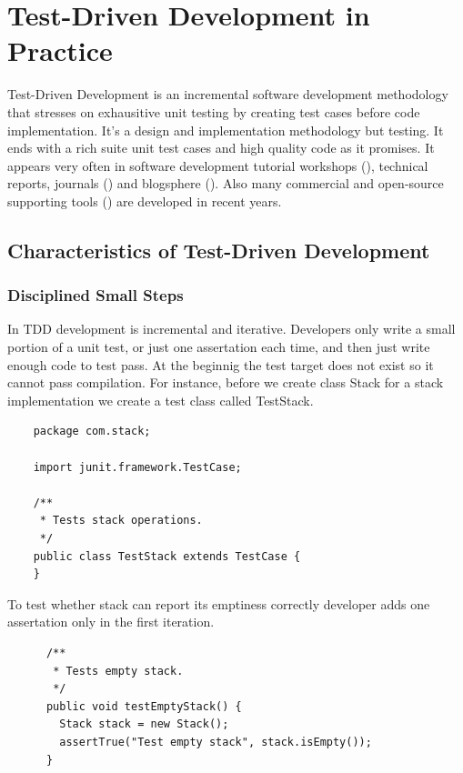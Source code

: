 \section{Test-Driven Development in Practice}
Test-Driven Development is an incremental software development methodology
that stresses on exhausitive unit testing by creating test cases before
code implementation. It's a design and implementation methodology but
testing.  It ends with a rich suite unit test cases and high quality code
as it promises. It appears very often in software development tutorial
workshops
(\cite{OsheroveWorkshop:04,ClarkwareWorkshop:04,BENUGWorkshop:04,AdaptionTddWorkshop,IntustrialLogicTddWorkshop}),
technical reports, journals (\cite{TestDrivenDotComArticles}) and
blogsphere (\cite{TestDrivenDotComWeblogs}). Also many commercial and
open-source supporting tools (\cite{TestDrivenDotComTools}) are developed
in recent years.

\subsection{Characteristics of Test-Driven Development}

\subsubsection{Disciplined Small Steps}
In TDD development is incremental and iterative. Developers only write a
small portion of a unit test, or just one assertation each time, and then
just write enough code to test pass. At the beginnig the test target does
not exist so it cannot pass compilation. For instance, before we create
class Stack for a stack implementation we create a test class called TestStack.

    \begin{verbatim}
    package com.stack;

    import junit.framework.TestCase;

    /**
     * Tests stack operations. 
     */
    public class TestStack extends TestCase {
    }
    \end{verbatim}

To test whether stack can report its emptiness correctly developer adds one
assertation only in the first iteration.

    \begin{verbatim}
      /**
       * Tests empty stack.
       */
      public void testEmptyStack() {
        Stack stack = new Stack();
        assertTrue("Test empty stack", stack.isEmpty());
      }
    \end{verbatim}

